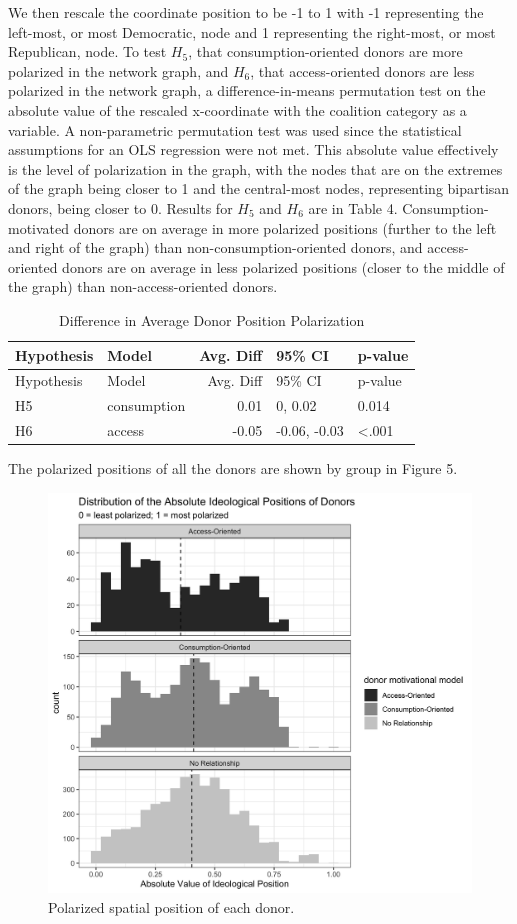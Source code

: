 \documentclass[12pt,]{article}
\begin{document}
We then rescale the coordinate position to be -1 to 1 with -1
representing the left-most, or most Democratic, node and 1 representing
the right-most, or most Republican, node. To test \(H_{5}\), that
consumption-oriented donors are more polarized in the network graph, and
\(H_{6}\), that access-oriented donors are less polarized in the network
graph, a difference-in-means permutation test on the absolute value of
the rescaled x-coordinate with the coalition category as a variable. A
non-parametric permutation test was used since the statistical
assumptions for an OLS regression were not met. This absolute value
effectively is the level of polarization in the graph, with the nodes
that are on the extremes of the graph being closer to 1 and the
central-most nodes, representing bipartisan donors, being closer to 0.
Results for \(H_{5}\) and \(H_{6}\) are in Table 4.
Consumption-motivated donors are on average in more polarized positions
(further to the left and right of the graph) than
non-consumption-oriented donors, and access-oriented donors are on
average in less polarized positions (closer to the middle of the graph)
than non-access-oriented donors.

\begin{longtable}[]{@{}llrll@{}}
\caption{Difference in Average Donor Position
Polarization}\tabularnewline
\toprule
Hypothesis & Model & Avg. Diff & 95\% CI & p-value\tabularnewline
\midrule
\endfirsthead
\toprule
Hypothesis & Model & Avg. Diff & 95\% CI & p-value\tabularnewline
\midrule
\endhead
H5 & consumption & 0.01 & 0, 0.02 & 0.014\tabularnewline
H6 & access & -0.05 & -0.06, -0.03 & \textless.001\tabularnewline
\bottomrule
\end{longtable}

The polarized positions of all the donors are shown by group in Figure
5.

\begin{figure}
\centering
\includegraphics{../tables_and_figures/fig_node_position_absolute.jpg}
\caption{Polarized spatial position of each donor.}
\end{figure}
\end{document}
